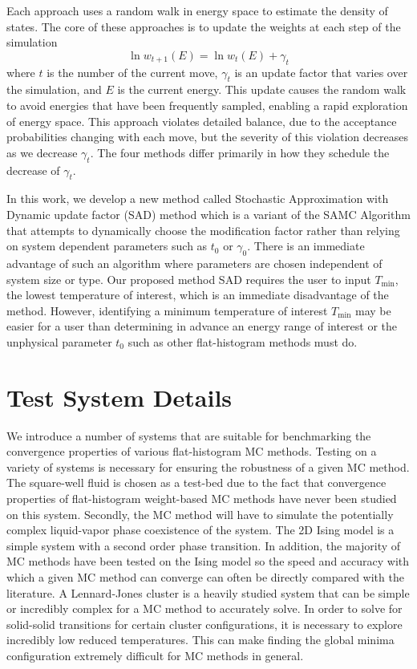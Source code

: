 Each approach uses a random walk in energy space to estimate the density of
states.  The core of these approaches is to update the weights at each step of
the simulation
\begin{equation}
	\ln{w_{t+1}(E)}=\ln{w_{t}(E)}
	+\gamma_t
\end{equation}
where $t$ is the number of the current move, $\gamma_t$ is an update factor
that varies over the simulation, and $E$ is the current energy.  This update
causes the random walk to avoid energies that have been frequently sampled,
enabling a rapid exploration of energy space. This approach violates detailed
balance, due to the acceptance probabilities changing with each move, but the
severity of this violation decreases as we decrease $\gamma_t$.  The four
methods differ primarily in how they schedule the decrease of $\gamma_t$.

In this work, we develop a new method called Stochastic Approximation with Dynamic update factor (SAD) method
which is a variant of the SAMC Algorithm that attempts to dynamically choose
the modification factor rather than relying on system dependent
parameters such as $t_0$ or $\gamma_0$.  There is an immediate
advantage of such an algorithm where parameters are chosen independent
of system size or type. Our
proposed method SAD requires the user to input $T_\text{min}$, the
lowest temperature of interest, which is an immediate disadvantage of
the method. However, identifying a minimum temperature of interest
$T_\text{min}$ may be easier for a user than determining in advance
an energy range of interest or the unphysical parameter $t_0$ such as other
flat-histogram methods must do.


\section{Test System Details}
We introduce a number of systems that are suitable for benchmarking the convergence properties of various
flat-histogram MC methods. Testing on a variety of systems is necessary for ensuring the robustness of a
given MC method. The square-well fluid is chosen as a test-bed due to the fact that convergence properties
of flat-histogram weight-based MC methods have never been studied on this system. Secondly, the MC method
will have to simulate the potentially complex liquid-vapor phase coexistence of the system. The 2D Ising
model is a simple system with a second order phase transition. In addition, the majority of MC methods have
been tested on the Ising model so the speed and accuracy with which a given MC method can converge can often
be directly compared with the literature. A Lennard-Jones cluster is a heavily studied system that can be
simple or incredibly complex for a MC method to accurately solve. In order to solve for solid-solid transitions
for certain cluster configurations, it is necessary to explore incredibly low reduced temperatures. This can
make finding the global minima configuration extremely difficult for MC methods in general.

